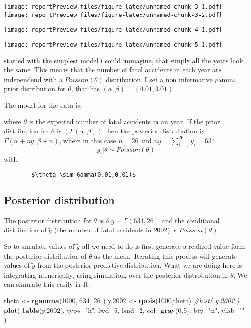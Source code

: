 \documentclass[]{article}
\newenvironment{Shaded}{\begin{snugshade}}{\end{snugshade}}
\newcommand{\KeywordTok}[1]{\textcolor[rgb]{0.13,0.29,0.53}{\textbf{#1}}}
\newcommand{\DataTypeTok}[1]{\textcolor[rgb]{0.13,0.29,0.53}{#1}}
\newcommand{\DecValTok}[1]{\textcolor[rgb]{0.00,0.00,0.81}{#1}}
\newcommand{\FloatTok}[1]{\textcolor[rgb]{0.00,0.00,0.81}{#1}}
\newcommand{\StringTok}[1]{\textcolor[rgb]{0.31,0.60,0.02}{#1}}
\newcommand{\CommentTok}[1]{\textcolor[rgb]{0.56,0.35,0.01}{\textit{#1}}}
\newcommand{\NormalTok}[1]{#1}
\begin{document}
\texttt{[image: reportPreview\_files/figure-latex/unnamed-chunk-3-1.pdf]}
\texttt{[image: reportPreview\_files/figure-latex/unnamed-chunk-3-2.pdf]}

\texttt{[image: reportPreview\_files/figure-latex/unnamed-chunk-4-1.pdf]}

\texttt{[image: reportPreview\_files/figure-latex/unnamed-chunk-5-1.pdf]}

started with the simplest model i could immagine, that simply all the
years look the same. This means that the number of fatal accidents in
each year are independend with a \(Poisson(\theta)\) distribution. I set
a non informative gamma prior distribution for \(\theta\), that has
\((\alpha, \beta) = (0.01,0.01)\)

The model for the data is:

where \(\theta\) is the expected number of fatal accidents in an year.
If the prior distribution for \(\theta\) is \((\Gamma(\alpha,\beta))\)
then the posterior distrubution is \(\Gamma(\alpha+n\bar y,\beta+n)\),
where in this case \(n=26\) and \(n\bar y= \sum^{26}_{i=1}y_i=634\)
\[y_i|\theta  \sim Poisson(\theta)\] with:

\begin{verbatim}
        $\theta \sim Gamma(0.01,0.01)$
\end{verbatim}

\subsection{Posterior distribution}\label{posterior-distribution}

The posterior distribution for \(\theta\) is
\(\theta|y \sim \Gamma(634,26)\) and the conditional distribution of
\(\tilde{y}\) (the number of fatal accidents in 2002) is
\(Poisson(\theta)\).

So to simulate values of \(\tilde{y}\) all we need to do is first
generate a realized value form the posterior distribution of \(\theta\)
as the mean. Iterating this process will generate values of
\(\tilde{y}\) from the posterior predictive distribution. What we are
doing here is integrating numerically, using simulation, over the
posterior distrobution in \(\theta\). We can simulate this easily in R.

\begin{Shaded}
\begin{Highlighting}[]
\NormalTok{theta <-}\StringTok{ }\KeywordTok{rgamma}\NormalTok{(}\DecValTok{1000}\NormalTok{, }\DecValTok{634}\NormalTok{, }\DecValTok{26}\NormalTok{ )}
\NormalTok{y.}\DecValTok{2002}\NormalTok{ <-}\StringTok{ }\KeywordTok{rpois}\NormalTok{(}\DecValTok{1000}\NormalTok{,theta)}
\CommentTok{#hist( y.2002 )}
\KeywordTok{plot}\NormalTok{( }\KeywordTok{table}\NormalTok{(y.}\DecValTok{2002}\NormalTok{), }\DataTypeTok{type=}\StringTok{"h"}\NormalTok{, }\DataTypeTok{lwd=}\DecValTok{5}\NormalTok{, }\DataTypeTok{lend=}\DecValTok{2}\NormalTok{, }\DataTypeTok{col=}\KeywordTok{gray}\NormalTok{(}\FloatTok{0.5}\NormalTok{), }\DataTypeTok{bty=}\StringTok{"n"}\NormalTok{, }\DataTypeTok{ylab=}\StringTok{""}\NormalTok{ )}
\end{Highlighting}
\end{Shaded}
\end{document}
